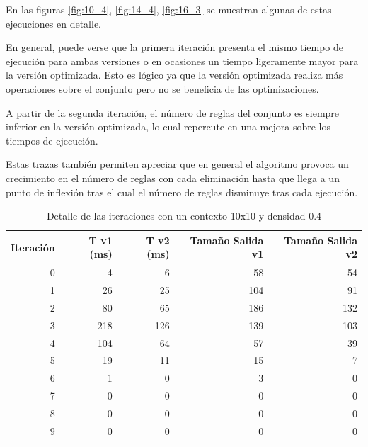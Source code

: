 	En las figuras \ref{fig:10_4}, \ref{fig:14_4}, \ref{fig:16_3}  se muestran algunas de estas ejecuciones en detalle.
	
	En general, puede verse que la primera iteración presenta el mismo tiempo de ejecución para ambas versiones o en ocasiones un tiempo ligeramente mayor para la versión optimizada. Esto es lógico ya que la versión optimizada realiza más operaciones sobre el conjunto pero no se beneficia de las optimizaciones.
	
	A partir de la segunda iteración, el número de reglas del conjunto es siempre inferior en la versión optimizada, lo cual repercute en una mejora sobre los tiempos de ejecución.
	
	Estas trazas también permiten apreciar que en general el algoritmo provoca un crecimiento en el número de reglas con cada eliminación hasta que llega a un punto de inflexión tras el cual el número de reglas disminuye tras cada ejecución. 
	
	\begin{table}[htbp]
		\caption{Detalle de las iteraciones con un contexto 10x10 y densidad 0.4}
		\begin{center}
			\begin{tabular}{|r|r|r|r|r|}
				\hline 
				Iteración  & T v1 (ms) & T v2 (ms) & Tamaño Salida v1  & Tamaño Salida v2  \\ \hline \hline
				0 & 4 & 6 & 58 & 54 \\ \hline
				1 & 26 & 25 & 104 & 91 \\ \hline
				2 & 80 & 65 & 186 & 132 \\ \hline
				3 & 218 & 126 & 139 & 103 \\ \hline
				4 & 104 & 64 & 57 & 39 \\ \hline
				5 & 19 & 11 & 15 & 7 \\ \hline
				6 & 1 & 0 & 3 & 0 \\ \hline
				7 & 0 & 0 & 0 & 0 \\ \hline
				8 & 0 & 0 & 0 & 0 \\ \hline
				9 & 0 & 0 & 0 & 0 \\ \hline
			\end{tabular}
		\end{center}
		\label{iteraciones10d4}
	\end{table}


